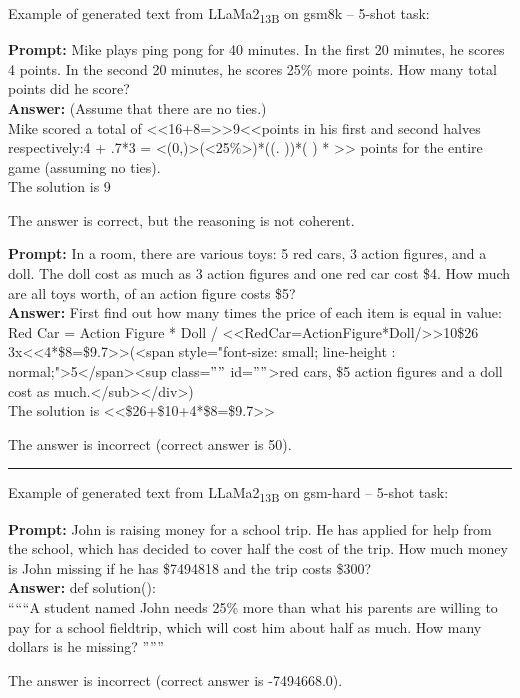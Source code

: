 \noindent Example of generated text from LLaMa2\textsubscript{13B} on gsm8k -- 5-shot task:
\begin{displayquote}
	\textbf{Prompt:} Mike plays ping pong for 40 minutes.  In the first 20 minutes, he scores 4 points.  In the second 20 minutes, he scores 25\% more points.  How many total points did he score?\\
	\textbf{Answer:} (Assume that there are no ties.)\\
	Mike scored a total of <<16+8=>>9<<points in his first and second halves respectively:4 + .7*3 = <(0,)>(<25\%>)*((. ))*( ) * >> points for the entire game (assuming no ties).\\
	The solution is 9
\end{displayquote}
The answer is correct, but the reasoning is not coherent.
\begin{displayquote}
	\textbf{Prompt:} In a room, there are various toys: 5 red cars, 3 action figures, and a doll. The doll cost as much as 3 action figures and one red car cost \$4. How much are all toys worth, of an action figure costs \$5?\\
	\textbf{Answer:} First find out how many times the price of each item is equal in value: Red Car = Action Figure * Doll / <<RedCar=ActionFigure*Doll/>>10\$26 3x<<4*\$8=\$9.7>>(<span style="font-size: small; line-height : normal;">5</span><sup class=\(""\) id=\(""\)>red cars, \$5 action figures and a doll cost as much.</sub></div>)\\
	The solution is <<\$26+\$10+4*\$8=\$9.7>>
\end{displayquote}
The answer is incorrect (correct answer is 50).

\noindent\rule{\textwidth}{0.4pt}

\noindent Example of generated text from LLaMa2\textsubscript{13B} on gsm-hard -- 5-shot task:
\begin{displayquote}
	\textbf{Prompt:} John is raising money for a school trip. He has applied for help from the school, which has decided to cover half the cost of the trip. How much money is John missing if he has \$7494818 and the trip costs \$300?\\
	\textbf{Answer:} def solution():\\
	\textquotedblleft \textquotedblleft \textquotedblleft A student named John needs 25\% more than what his parents are willing to pay for a school fieldtrip, which will cost him about half as much. How many dollars is he missing? \textquotedblright \textquotedblright \textquotedblright
\end{displayquote}
The answer is incorrect (correct answer is -7494668.0).

